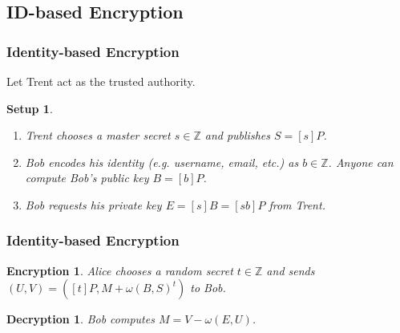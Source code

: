 \documentclass{beamer}
\newtheorem{setup}{Setup}
\newtheorem{encryption}{Encryption}
\newtheorem{decryption}{Decryption}
\begin{document}
    \subsection{ID-based Encryption}
    \begin{frame}
        \frametitle{Identity-based Encryption}
        Let Trent act as the trusted authority.
        \vfill
        \begin{setup}
            \begin{enumerate}
                \item Trent chooses a master secret \(s \in \mathbb{Z}\) and
                    publishes \(S = [s]P\).
                \item Bob encodes his identity (e.g. username, email, etc.)
                    as \(b \in \mathbb{Z}\). Anyone can compute Bob's public
                    key \(B = [b]P\).
                \item Bob requests his private key
                    \(E = [s]B = [sb]P\) from Trent.
            \end{enumerate}
        \end{setup}
    \end{frame}

    \begin{frame}
        \frametitle{Identity-based Encryption}
        \begin{encryption}
            Alice chooses a random secret \(t \in \mathbb{Z}\) and sends
            \((U, V) = ([t]P, M + \omega(B, S)^t)\) to Bob.
        \end{encryption}
        \vfill
        \begin{decryption}
            Bob computes \(M = V - \omega(E, U)\).
        \end{decryption}
    \end{frame}
\end{document}

